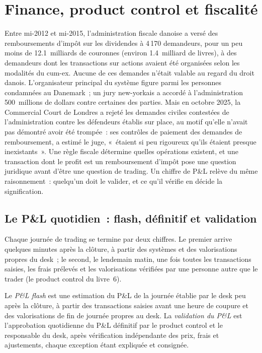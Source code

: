 \chapter{Finance, product control et fiscalité}\label{ch:fm:finance-product-control-and-tax}

Entre mi-2012 et mi-2015, l'administration fiscale danoise a versé des remboursements d'impôt sur les dividendes à 4\,170 demandeurs, pour un peu moins de 12.1~milliards de couronnes (environ
1.4~milliard de livres), à des demandeurs dont les transactions sur actions avaient été organisées selon les modalités du cum-ex. Aucune de ces demandes n'était valable au regard du droit danois. L'organisateur
principal du système figure parmi les personnes condamnées au Danemark~; un jury new-yorkais a accordé à l'administration 500~millions de dollars contre certaines des parties. Mais en
octobre 2025, la Commercial Court de Londres a rejeté les demandes civiles contestées de l'administration contre les défendeurs établis sur place, au motif qu'elle n'avait pas démontré avoir été
trompée~: ses contrôles de paiement des demandes de remboursement, a estimé le juge, «~étaient si peu rigoureux qu'ils étaient presque inexistants~». Une règle fiscale détermine quelles opérations
existent, et une transaction dont le profit est un remboursement d'impôt pose une question juridique avant d'être une question de trading. Un chiffre de P\&L relève du même raisonnement~: quelqu'un doit le valider,
et ce qu'il vérifie en décide la signification.

\section{Le P\&L quotidien~: flash, définitif et validation}

Chaque journée de trading se termine par deux chiffres. Le premier arrive quelques minutes après la clôture, à partir des systèmes et des valorisations propres du desk~; le second, le
lendemain matin, une fois toutes les transactions saisies, les frais prélevés et les valorisations vérifiées par une personne autre que le trader (le product control du livre~6).

\begin{definition}\label{def:fm:finance-product-control-and-tax:flash}
Le \emph{P\&L flash} est une estimation du P\&L de la journée établie par le desk peu après la clôture, à partir des transactions saisies avant une
heure de coupure et des valorisations de fin de journée propres au desk. La \emph{validation du P\&L} est l'approbation quotidienne du P\&L définitif
par le product control et le responsable du desk, après vérification indépendante des prix, frais et ajustements, chaque exception étant expliquée et consignée.
\end{definition}

